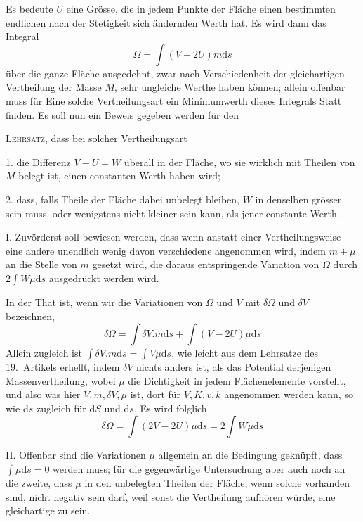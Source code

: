 Es bedeute $U$ eine Grösse, die in jedem Punkte der Fläche einen bestimmten endlichen nach der Stetigkeit sich ändernden Werth hat. Es wird dann das Integral
\[
\Omega=\int(V-2U)m\mathrm ds
\]
über die ganze Fläche ausgedehnt, zwar nach Verschiedenheit der gleichartigen Vertheilung der Masse $M$, sehr ungleiche Werthe haben können; allein offenbar
muss für Eine solche Vertheilungsart ein Minimumwerth dieses Integrals Statt finden. Es soll nun ein Beweis gegeben werden für den

\textsc{Lehrsatz,} dass bei solcher Vertheilungsart

1. die Differenz $V-U=W$ überall in der Fläche, wo sie wirklich mit Theilen von $M$ belegt ist, einen constanten Werth haben wird;

2. dass, falls Theile der Fläche dabei unbelegt bleiben, $W$ in denselben grösser sein muss, oder wenigstens nicht kleiner sein kann, als jener constante Werth.

I. Zuvörderst soll bewiesen werden, dass wenn anstatt einer Verthei\-lungsweise eine andere unendlich wenig davon verschiedene angenommen wird, indem $m+\mu$ an die Stelle von $m$ gesetzt wird, die daraus entspringende Variation von $\Omega$ durch $2\int W\mu\mathrm ds$ ausgedrückt werden wird.

In der That ist, wenn wir die Variationen von $\Omega$ und $V$ mit $\delta\Omega$ und $\delta V$ bezeichnen,
\[
\delta\Omega=\int\delta V.m\mathrm ds+\int(V-2U)\mu\mathrm ds
\]
Allein zugleich ist $\int\delta V.m\mathrm ds=\int V\mu\mathrm ds$, wie leicht aus dem Lehrsatze des 19.\ Artikels erhellt, indem $\delta V$ nichts anders ist, als das Potential derjenigen Massenvertheilung, wobei $\mu$ die Dichtigkeit in jedem Flächenelemente vorstellt, und also was hier $V,m,\delta V,\mu$ ist, dort für $V,K,v,k$ angenommen werden kann, so wie $\mathrm ds$ zugleich für $\mathrm dS$ und $\mathrm ds$. Es wird folglich
\[
\delta\Omega=\int(2V-2U)\mu\mathrm ds=2\int W\mu\mathrm ds
\]

II. Offenbar sind die Variationen $\mu$ allgemein an die Bedingung geknüpft, dass $\int\mu\mathrm ds=0$ werden muss; für die gegenwärtige Untersuchung aber auch noch an die zweite, dass $\mu$ in den unbelegten Theilen der Fläche, wenn solche vorhanden sind, nicht negativ sein darf, weil sonst die Vertheilung aufhören würde, eine gleichartige zu sein.


